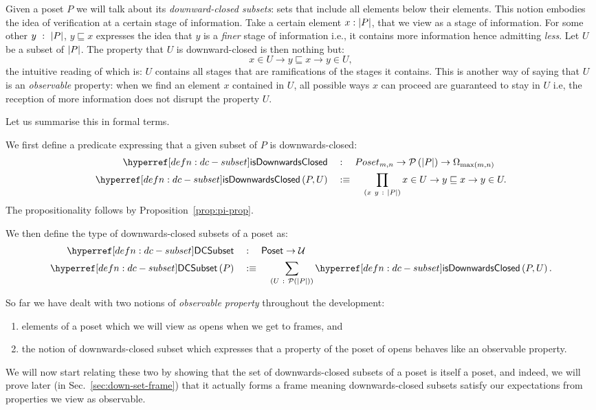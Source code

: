 Given a poset $P$ we will talk about its \emph{downward-closed subsets}: sets that include
all elements below their elements. This notion embodies the idea of verification at a
certain stage of information. Take a certain element $x : \left| P \right|$, that we view as a
stage of information. For some other $y~:~\left| P \right|$, $y \sqsubseteq x$ expresses the idea that $y$ is
a \emph{finer} stage of information i.e., it contains more information hence admitting
\emph{less}. Let $U$ be a subset of $\left| P \right|$. The property that $U$ is downward-closed is
then nothing but:
\begin{equation*}
  x \in U \rightarrow y \sqsubseteq x \rightarrow y \in U,
\end{equation*}
the intuitive reading of which is: $U$ contains all stages that are ramifications of the
stages it contains. This is another way of saying that $U$ is an \emph{observable}
property: when we find an element $x$ contained in $U$, all possible ways $x$ can proceed
are guaranteed to stay in $U$ i.e, the reception of more information does not disrupt the
property $U$.

Let us summarise this in formal terms.
\begin{defn}\label{defn:dc-subset}
  We first define a predicate expressing that a given subset of $P$ is downwards-closed:
  \begin{align*}
    \isdcnm{}   &\quad:\quad  Poset_{m, n} \rightarrow \pow{\abs{P}} \rightarrow \Omega_{\max(m, n)}\\
    \isdc{P, U} &\quad\is{}\quad \pity{x~y}{\abs{P}}{x \in U \rightarrow y \sqsubseteq x \rightarrow y \in U}.
  \end{align*}
  The propositionality follows by Proposition~\ref{prop:pi-prop}.

  We then define the type of downwards-closed subsets of a poset as:
  \begin{align*}
    \dcsubsetnm{} &\quad:\quad \mathsf{Poset} \rightarrow \univ{}                     \\
    \dcsubset{P}  &\quad\is{}\quad \sigmaty{U}{\pow{\abs{P}}}{\isdc{P, U}}  .
  \end{align*}
\end{defn}

So far we have dealt with two notions of \emph{observable property} throughout the
development:
\begin{enumerate}
  \item elements of a poset which we will view as opens when we get to frames, and
  \item the notion of downwards-closed subset which expresses that a property of the poset
    of opens behaves like an observable property.
\end{enumerate}
We will now start relating these two by showing that the set of downwards-closed subsets
of a poset is itself a poset, and indeed, we will prove later (in
Sec.~\ref{sec:down-set-frame}) that it actually forms a frame meaning downwards-closed
subsets satisfy our expectations from properties we view as observable.

